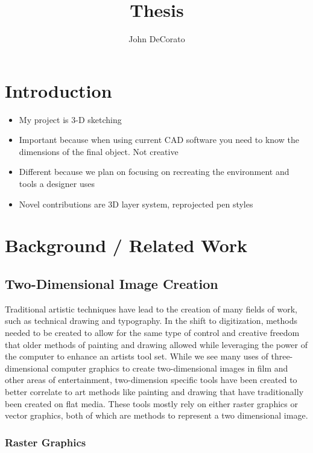 \documentclass[12pt]{article}
\title{Thesis}
\author{John DeCorato}
\date{ }
\begin{document}
 
\maketitle
 
\tableofcontents

\pagebreak
\section{Introduction}

\begin{itemize}
	\item My project is 3-D sketching
	\item Important because when using current CAD software you need to know the dimensions of the final object. Not creative
	\item Different because we plan on focusing on recreating the environment and tools a designer uses
	\item Novel contributions are 3D layer system, reprojected pen styles 
\end{itemize}

\pagebreak
\section{Background / Related Work}

\subsection{Two-Dimensional Image Creation}

Traditional artistic techniques have lead to the creation of many fields of work, such as technical drawing and typography. 
In the shift to digitization, methods needed to be created to allow for the same type of control and creative freedom that older methods of painting and drawing allowed while leveraging the power of the computer to enhance an artists tool set.
While we see many uses of three-dimensional computer graphics to create two-dimensional images in film and other areas of entertainment, two-dimension specific tools have been created to better correlate to art methods like painting and drawing that have traditionally been created on flat media.
These tools mostly rely on either raster graphics or vector graphics, both of which are methods to represent a two dimensional image. 

\pagebreak
\subsubsection{Raster Graphics}
\end{document}
